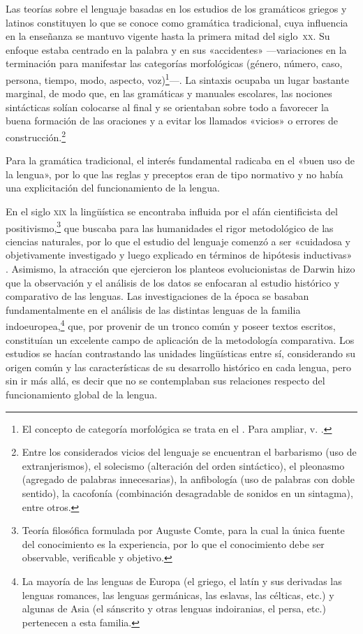 Las teorías sobre el lenguaje basadas en los estudios de los gramáticos griegos
y latinos constituyen lo que se conoce como gramática tradicional, cuya
influencia en la enseñanza se mantuvo vigente hasta la primera mitad del
siglo~\textsc{xx}. Su enfoque estaba centrado en la palabra y en sus
«accidentes» ---variaciones en la terminación para manifestar las categorías
morfológicas (género, número, caso, persona, tiempo, modo, aspecto,
voz)\footnote{El concepto de categoría morfológica se trata en el .
Para ampliar, v. \textcite{giammatteo2018}.}---. La sintaxis ocupaba un lugar
bastante marginal, de modo que, en las gramáticas y manuales escolares, las
nociones sintácticas solían colocarse al final y se orientaban sobre todo a
favorecer la buena formación de las oraciones y a evitar los llamados «vicios»
o errores de construcción.\footnote{Entre los considerados vicios del lenguaje
se encuentran el barbarismo (uso de extranjerismos), el solecismo (alteración
del orden sintáctico), el pleonasmo (agregado de palabras innecesarias), la
anfibología (uso de palabras con doble sentido), la cacofonía (combinación
desagradable de sonidos en un sintagma), entre otros.}

\begin{destacado}
Para la gramática tradicional, el interés fundamental radicaba en el «buen uso
de la lengua», por lo que las reglas y preceptos eran de tipo normativo y no
había una explicitación del funcionamiento de la lengua.
\end{destacado}

En el siglo \textsc{xix} la lingüística se encontraba influida por el afán
cientificista del positivismo,\footnote{Teoría filosófica formulada por
Auguste Comte, para la cual la única fuente del conocimiento es la experiencia,
por lo que el conocimiento debe ser observable, verificable y objetivo.} que
buscaba para las humanidades el rigor metodológico de las ciencias naturales,
por lo que el estudio del lenguaje comenzó a ser «cuidadosa y objetivamente
investigado y luego explicado en términos de hipótesis inductivas»
\parencite[22]{lyons1985}. Asimismo, la atracción que ejercieron los planteos
evolucionistas de Darwin hizo que la observación y el análisis de los datos se
enfocaran al estudio histórico y comparativo de las lenguas. Las
investigaciones de la época se basaban fundamentalmente en el análisis de las
distintas lenguas de la familia indoeuropea,\footnote{\label{fn:01-indoeuropea}La mayoría de las lenguas
de Europa (el griego, el latín y sus derivadas las lenguas romances, las
lenguas germánicas, las eslavas, las célticas, etc.) y algunas de Asia (el
sánscrito y otras lenguas indoiranias, el persa, etc.) pertenecen a esta
familia.} que, por provenir de un tronco común y poseer textos escritos,
constituían un excelente campo de aplicación de la metodología comparativa. Los
estudios se hacían contrastando las unidades lingüísticas entre sí,
considerando su origen común y las características de su desarrollo histórico
en cada lengua, pero sin ir más allá, es decir que no se contemplaban sus
relaciones respecto del funcionamiento global de la lengua.

